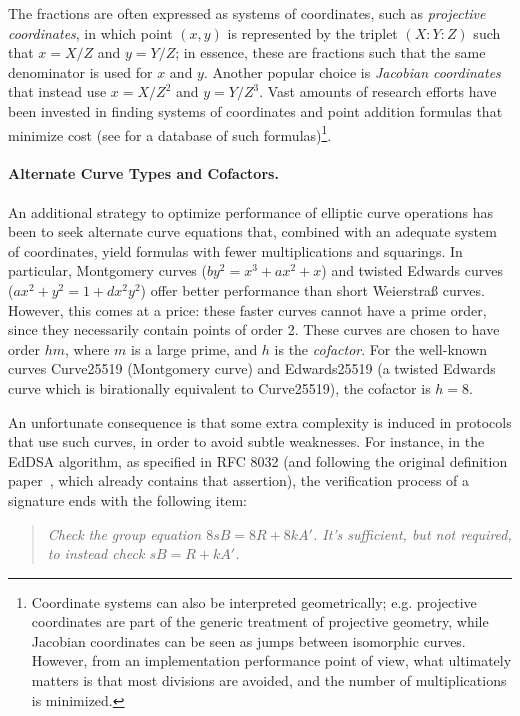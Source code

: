 \documentclass{llncs}
\begin{document}
The fractions are often expressed as systems of coordinates, such as
\emph{projective coordinates}, in which point $(x,y)$ is represented by
the triplet $(X{:}Y{:}Z)$ such that $x = X/Z$ and $y = Y/Z$; in essence,
these are fractions such that the same denominator is used for $x$ and
$y$. Another popular choice is \emph{Jacobian coordinates} that instead
use $x = X/Z^2$ and $y = Y/Z^3$. Vast amounts of research efforts have
been invested in finding systems of coordinates and point addition
formulas that minimize cost (see \cite{EFD} for a database of such
formulas)\footnote{Coordinate systems can also be interpreted
geometrically; e.g. projective coordinates are part of the generic
treatment of projective geometry, while Jacobian coordinates can be seen
as jumps between isomorphic curves. However, from an implementation
performance point of view, what ultimately matters is that most
divisions are avoided, and the number of multiplications is minimized.}.

\paragraph{Alternate Curve Types and Cofactors.}

An additional strategy to optimize performance of elliptic curve
operations has been to seek alternate curve equations that, combined
with an adequate system of coordinates, yield formulas with fewer
multiplications and squarings. In particular, Montgomery curves ($by^2 =
x^3 + ax^2 + x$) and twisted Edwards curves ($ax^2 + y^2 = 1 + dx^2y^2$)
offer better performance than short Weierstraß curves. However, this
comes at a price: these faster curves cannot have a prime order, since
they necessarily contain points of order 2. These curves are chosen
to have order $hm$, where $m$ is a large prime, and $h$ is the
\emph{cofactor}. For the well-known curves Curve25519 (Montgomery
curve) and Edwards25519 (a twisted Edwards curve which is birationally
equivalent to Curve25519), the cofactor is $h = 8$.

An unfortunate consequence is that some extra complexity is induced in
protocols that use such curves, in order to avoid subtle weaknesses. For
instance, in the EdDSA algorithm, as specified in RFC
8032\cite{EdDSArfc8032} (and following the original definition
paper~\cite{BerDuiLanSchYan2012}, which already contains that
assertion), the verification process of a signature ends with the
following item:

    \begin{quote}
    \textit{Check the group equation $8sB = 8R + 8kA'$. It's sufficient,
    but not required, to instead check $sB = R + kA'$.}
    \end{quote}
\end{document}
